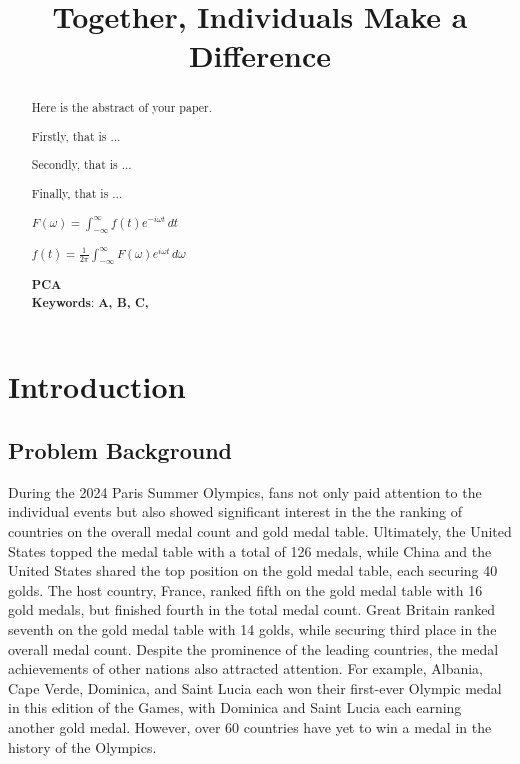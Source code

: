 \documentclass[12pt]{article}  %
\title{Together, Individuals Make a Difference}  %
\begin{document}
\begin{abstract}
    Here is the abstract of your paper.

    Firstly, that is ...

    Secondly, that is ...

    Finally, that is ...

$F(\omega) = \int_{-\infty}^{\infty} f(t) e^{-i \omega t} \, dt$


$f(t) = \frac{1}{2\pi} \int_{-\infty}^{\infty} F(\omega) e^{i \omega t} \, d\omega$

    
    
    \textbf{PCA}\\
 
    \vspace{5pt}
    \textbf{Keywords}: \textbf{ A, B, C,  }
    
	
\end{abstract}

\maketitle  %
\tableofcontents  %


\section{Introduction}
\subsection{Problem Background}
During the 2024 Paris Summer Olympics, fans not only paid attention to the individual events but also showed significant interest in the the ranking of countries on the overall medal count and  gold medal table. Ultimately, the United States topped the medal table with a total of 126 medals, while China and the United States shared the top position on the gold medal table, each securing 40 golds. The host country, France, ranked fifth on the gold medal table with 16 gold medals, but finished fourth in the total medal count. Great Britain ranked seventh on the gold medal table with 14 golds, while securing third place in the overall medal count. Despite the prominence of the leading countries, the medal achievements of other nations also attracted attention. For example, Albania, Cape Verde, Dominica, and Saint Lucia each won their first-ever Olympic medal in this edition of the Games, with Dominica and Saint Lucia each earning another gold medal. However, over 60 countries have yet to win a medal in the history of the Olympics. 
\end{document}
